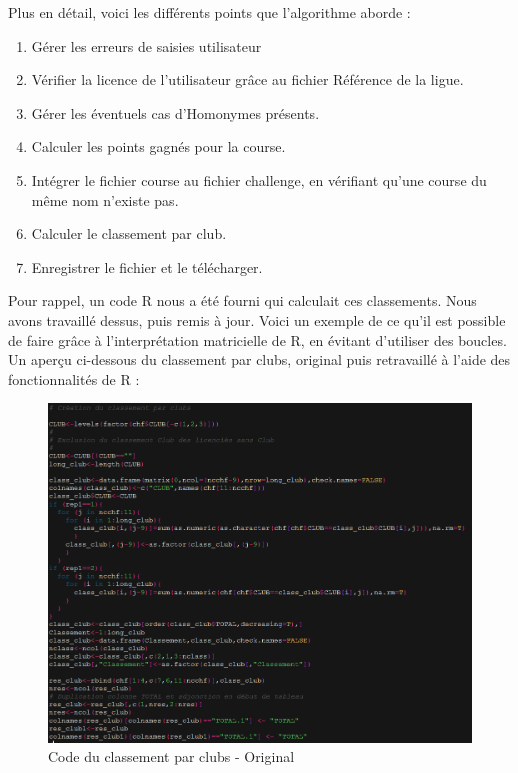 Plus en détail, voici les différents points que l'algorithme aborde :

\begin{enumerate} 
	\item Gérer les erreurs de saisies utilisateur
	\item Vérifier la licence de l'utilisateur grâce au fichier Référence de la ligue.
	\item Gérer les éventuels cas d'Homonymes présents.
	\item Calculer les points gagnés pour la course.
	\item Intégrer le fichier course au fichier challenge, en vérifiant qu'une course du même nom n'existe pas.
	\item Calculer le classement par club.
	\item Enregistrer le fichier et le télécharger.
\end{enumerate}

Pour rappel, un code R nous a été fourni qui calculait ces classements. Nous avons travaillé dessus, puis remis à jour.
Voici un exemple de ce qu'il est possible de faire grâce à l'interprétation matricielle de R, en évitant d'utiliser des boucles.
Un aperçu ci-dessous du classement par clubs, original puis retravaillé à l'aide des fonctionnalités de R :

\begin{figure}[!h]
	\center
	\includegraphics[scale=0.9]{img/codeoriginal.PNG}
	\caption {Code du classement par clubs - Original}
\end{figure}

